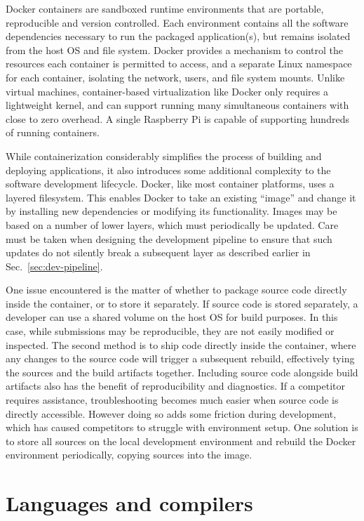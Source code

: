 \documentclass[12pt,initial,twoside,maitrise]{dms}
\numberwithin{equation}{section}
\numberwithin{table}{chapter}
\numberwithin{figure}{chapter}
\begin{document}
    Docker containers are sandboxed runtime environments that are portable, reproducible and version controlled. Each environment contains all the software dependencies necessary to run the packaged application(s), but remains isolated from the host OS and file system. Docker provides a mechanism to control the resources each container is permitted to access, and a separate Linux namespace for each container, isolating the network, users, and file system mounts. Unlike virtual machines, container-based virtualization like Docker only requires a lightweight kernel, and can support running many simultaneous containers with close to zero overhead. A single Raspberry Pi is capable of supporting hundreds of running containers.

    While containerization considerably simplifies the process of building and deploying applications, it also introduces some additional complexity to the software development lifecycle. Docker, like most container platforms, uses a layered filesystem. This enables Docker to take an existing ``image'' and change it by installing new dependencies or modifying its functionality. Images may be based on a number of lower layers, which must periodically be updated. Care must be taken when designing the development pipeline to ensure that such updates do not silently break a subsequent layer as described earlier in Sec.~\ref{sec:dev-pipeline}.

    One issue encountered is the matter of whether to package source code directly inside the container, or to store it separately. If source code is stored separately, a developer can use a shared volume on the host OS for build purposes. In this case, while submissions may be reproducible, they are not easily modified or inspected. The second method is to ship code directly inside the container, where any changes to the source code will trigger a subsequent rebuild, effectively tying the sources and the build artifacts together. Including source code alongside build artifacts also has the benefit of reproducibility and diagnostics. If a competitor requires assistance, troubleshooting becomes much easier when source code is directly accessible. However doing so adds some friction during development, which has caused competitors to struggle with environment setup. One solution is to store all sources on the local development environment and rebuild the Docker environment periodically, copying sources into the image.

    \chapter*{Languages and compilers}
\end{document}
